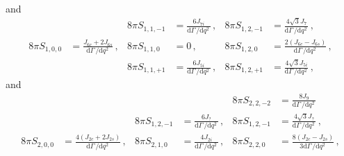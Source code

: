 \documentclass[aps,prd,reprint,nofootinbib,preprintnumbers]{revtex4}
\newcommand{\rmdx}[1]{\mbox{d} #1 \,} %
\begin{document}
and
\begin{equation}
\begin{aligned}
%
                      &                                                                                    &
    8\pi S_{1, 1, -1} & = \frac{6 J_{7i}}{\rmdx{\Gamma}/\rmdx{q^2}}\,,                                     &
    8\pi S_{1, 2, -1} & = \frac{4 \sqrt{3} J_{7}}{\rmdx{\Gamma}/\rmdx{q^2}}\,,                             \\
%
    8\pi S_{1, 0,  0} & = \frac{J_{6c} + 2 J_{6s}}{\rmdx{\Gamma}/\rmdx{q^2}}\,,                            &
    8\pi S_{1, 1,  0} & = 0\,,                                                                             &
    8\pi S_{1, 2,  0} & = \frac{2(J_{6c} - J_{6s})}{\rmdx{\Gamma}/\rmdx{q^2}}\,,                           \\
%
                      &                                                                                    &
    8\pi S_{1, 1, +1} & = \frac{6 J_{5i}}{\rmdx{\Gamma}/\rmdx{q^2}}\,,                                     &
    8\pi S_{1, 2, +1} & = \frac{4 \sqrt{3} J_{5i}}{\rmdx{\Gamma}/\rmdx{q^2}}\,,
\end{aligned}
\end{equation}
and
\begin{equation}
\begin{aligned}
%
                 &                                                                                    &
                 &                                                                                    &
    8\pi S_{2, 2, -2} & = \frac{8 J_9}{\rmdx{\Gamma}/\rmdx{q^2}}                                           \\
%
                 &                                                                                    &
    8\pi S_{1, 2, -1} & = \frac{6 J_{?}}{\rmdx{\Gamma}/\rmdx{q^2}}\,,                                      &
    8\pi S_{1, 2, -1} & = \frac{4 \sqrt{3} J_{?}}{\rmdx{\Gamma}/\rmdx{q^2}}\,,                             \\
%
    8\pi S_{2, 0,  0} & = \frac{4 (J_{2c} + 2 J_{2s})}{\rmdx{\Gamma}/\rmdx{q^2}}\,,                        &
    8\pi S_{2, 1,  0} & = \frac{4 J_{2i}}{\rmdx{\Gamma}/\rmdx{q^2}}\,,                                     &
    8\pi S_{2, 2,  0} & = \frac{8 (J_{2c} - J_{2s})}{3 \rmdx{\Gamma}/\rmdx{q^2}}\,,                        \\
\end{aligned}
\end{equation}
\end{document}
